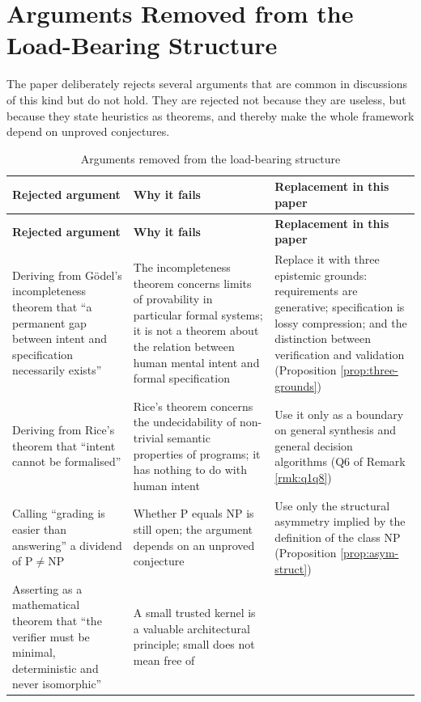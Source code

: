 \section{Arguments Removed from the Load-Bearing Structure}

The paper deliberately rejects several arguments that are common in discussions of this
kind but do not hold. They are rejected not because they are useless, but because they
state heuristics as theorems, and thereby make the whole framework depend on unproved
conjectures.

\begin{longtable}{L{3.4cm}L{5.2cm}L{5.6cm}}
\caption{Arguments removed from the load-bearing structure}\label{tab:overreach}\\
\toprule
\textbf{Rejected argument} & \textbf{Why it fails} & \textbf{Replacement in this paper} \\
\midrule
\endfirsthead
\toprule
\textbf{Rejected argument} & \textbf{Why it fails} & \textbf{Replacement in this paper} \\
\midrule
\endhead
\bottomrule
\endlastfoot
Deriving from G\"odel's incompleteness theorem that ``a permanent gap between intent and
  specification necessarily exists'' &
  The incompleteness theorem concerns limits of provability in particular formal systems;
  it is not a theorem about the relation between human mental intent and formal
  specification &
  Replace it with three epistemic grounds: requirements are generative; specification is
  lossy compression; and the distinction between verification and validation
  (Proposition \ref{prop:three-grounds}) \\
Deriving from Rice's theorem that ``intent cannot be formalised'' &
  Rice's theorem concerns the undecidability of non-trivial semantic properties of
  programs; it has nothing to do with human intent &
  Use it only as a boundary on general synthesis and general decision algorithms (Q6 of
  Remark \ref{rmk:q1q8}) \\
Calling ``grading is easier than answering'' a dividend of $\mathrm{P}\neq\mathrm{NP}$ &
  Whether $\mathrm{P}$ equals $\mathrm{NP}$ is still open; the argument depends on an
  unproved conjecture &
  Use only the structural asymmetry implied by the definition of the class $\mathrm{NP}$
  (Proposition \ref{prop:asym-struct}) \\
Asserting as a mathematical theorem that ``the verifier must be minimal, deterministic and
  never isomorphic'' &
  A small trusted kernel is a valuable architectural principle; small does not mean free of

\end{longtable}
